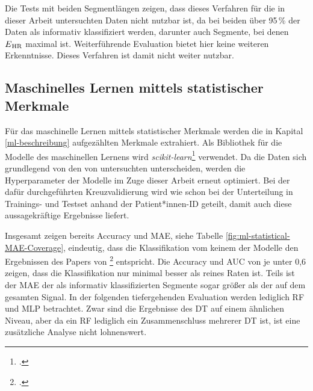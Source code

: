 Die Tests mit beiden Segmentlängen zeigen, dass dieses Verfahren für die in dieser Arbeit untersuchten Daten nicht nutzbar ist, da bei beiden über 95\,\% der Daten als informativ klassifiziert werden, darunter auch Segmente, bei denen $E\textsubscript{HR}$ maximal ist. Weiterführende Evaluation bietet hier keine weiteren Erkenntnisse. Dieses Verfahren ist damit nicht weiter nutzbar.

\subsection{Maschinelles Lernen mittels statistischer Merkmale}\label{res-statistical}

Für das maschinelle Lernen mittels statistischer Merkmale werden die in Kapital \ref{ml-beschreibung} aufgezählten Merkmale extrahiert. Als Bibliothek für die Modelle des maschinellen Lernens wird \textit{scikit-learn}\footcite[]{scikit-learn} verwendet. Da die Daten sich grundlegend von den von \citeauthor{Sadek2016} untersuchten unterscheiden, werden die Hyperparameter der Modelle im Zuge dieser Arbeit erneut optimiert. Bei der dafür durchgeführten Kreuzvalidierung wird wie schon bei der Unterteilung in Trainings- und Testset anhand der Patient*innen-ID geteilt, damit auch diese aussagekräftige Ergebnisse liefert.

Insgesamt zeigen bereits Accuracy und \ac{MAE}, siehe Tabelle \ref{fig:ml-statistical-MAE-Coverage}, eindeutig, dass die Klassifikation vom keinem der Modelle den Ergebnissen des Papers von \citeauthor{Sadek2016}\footcite{Sadek2016} entspricht. Die Accuracy und AUC von je unter 0,6 zeigen, dass die Klassifikation nur minimal besser als reines Raten ist. Teils ist der \ac{MAE} der als informativ klassifizierten Segmente sogar größer als der auf dem gesamten Signal. In der folgenden tiefergehenden Evaluation werden lediglich \ac{RF} und \ac{MLP} betrachtet. Zwar sind die Ergebnisse des \ac{DT} auf einem ähnlichen Niveau, aber da ein \ac{RF} lediglich ein Zusammenschluss mehrerer \ac{DT} ist, ist eine zusätzliche Analyse nicht lohnenswert. 

